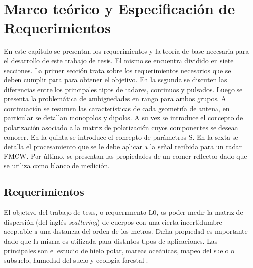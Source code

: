 
\chapter{Marco teórico y Especificación de Requerimientos} \label{ch:theory}


\ifpdf
    \graphicspath{{Chapter2/Figs/Raster/}{Chapter2/Figs/PDF/}{Chapter2/Figs/}}
\else
    \graphicspath{{Chapter2/Figs/Vector/}{Chapter2/Figs/}}
\fi

En este capítulo se presentan los requerimientos y la teoría de base necesaria para el desarrollo de este trabajo de tesis. El mismo se encuentra dividido en siete secciones. La primer sección trata sobre los requerimientos necesarios que se deben cumplir para para obtener el objetivo. En la segunda se discuten las diferencias entre los principales tipos de radares, continuos y pulsados. Luego se presenta la problemática de ambigüedades en rango para ambos grupos. A continuación se resumen las características de cada geometría de antena, en particular se detallan monopolos y dipolos. A su vez se introduce el concepto de polarización asociado a la matriz de polarización cuyos componentes se desean conocer. En la quinta se introduce el concepto de parámetros S. En la sexta se detalla el procesamiento que se le debe aplicar a la señal recibida para un radar FMCW. Por último, se presentan las propiedades de un corner reflector dado que se utiliza como blanco de medición.

\section{Requerimientos}

El objetivo del trabajo de tesis, o requerimiento L0, es poder medir la matriz de dispersión (del inglés \textit{scattering}) de cuerpos con una cierta incertidumbre aceptable a una distancia del orden de los metros. Dicha propiedad es importante dado que la misma es utilizada para distintos tipos de aplicaciones. Las principales son el estudio de hielo polar, mareas oceánicas, mapeo del suelo o subsuelo, humedad del suelo y ecología forestal \cite{Curlander}.

